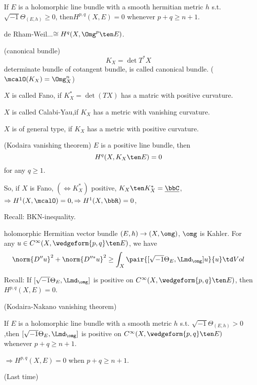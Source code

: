 \begin{thm}If $E$ is a holomorphic line bundle
with a smooth hermitian metric $h$ s.t. $\sqrt{-1}\Theta_{(E,h)}\geq 0$,
then$H^{p,q}(X,E)=0$ whenever $p+q\geq n+1$.
\end{thm}
de Rham-Weil...$\cong H^q(X,\Omg^p\ten E)$.

\begin{definition}(canonical bundle)
$$K_X=\det T^*X$$
determinate bundle of cotangent bundle,
is called canonical bundle.
($\mcalO(K_X)=\Omg_X^n$)
\end{definition}


\begin{definition}
$X$ is called Fano, if $K_X^*=\det(TX)$ has a matric with positive curvature.

$X$ is called Calabi-Yau,if $K_X$ has a metric with vanishing curvature.

$X$ is of general type, if $K_X$ has a metric with positive curvature.
\end{definition}


\begin{cor}(Kodaira vanishing theorem)
$E$ is a positive line bundle, then
$$H^q(X,K_X\ten E)=0$$
for any $q\geq 1$.
\end{cor}

So, if $X$ is Fano, $(\iff K_X^*)$ positive,
$K_X\ten K_X^*=\underline{\bbC}$,
$\Rightarrow H^1(X,\mcalO)=0,\Rightarrow H^1(X,\bbR)=0$,


Recall: BKN-inequality.

holomorphic Hermitian vector bundle $(E,h)\to (X,\omg)$, $\omg$ is Kahler.
For any $u\in C^\infty(X,\wedgeform{p,q}\ten E)$, we have
$$
  \norm{D''u}^2+\norm{D''^*u}^2
\geq
  \int_X
    \pair{[\sqrt{-1}\Theta_E,\Lmd_\omg]u}{u}
    \td Vol
$$

Recall: If $[\sqrt{-1}\Theta_E,\Lmd_\omg]$ is positive on
$C^\infty(X,\wedgeform{p,q}\ten E)$, then
$H^{p,q}(X,E)=0$.

\begin{thm}(Kodaira-Nakano vanishing theorem)

If $E$ is a holomorphic line bundle with a smooth metric $h$ s.t.
$\sqrt{-1}\Theta_{(E,h)}>0$,then
$[\sqrt{-1}\Theta_E,\Lmd_\omg]$ is positive on
$C^\infty(X,\wedgeform{p,q}\ten E)$ whenever $p+q\geq n+1$.

$\Rightarrow H^{p,q}(X,E)=0$ when $p+q\geq n+1$.
\end{thm}
(Last time)

